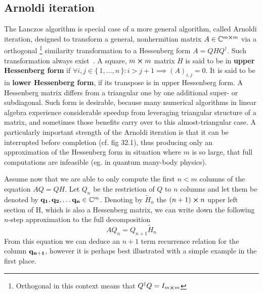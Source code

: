 \subsection{Arnoldi iteration}
The Lanczos algorithm is special case of a more general algorithm, called Arnoldi iteration, designed to transform
a general, nonhermitian matrix \(A\in \mathbb{C}^{m\cross m} \) via a orthogonal
\footnote{Orthogonal in this context means that \(Q^{\dagger}Q = I_{m \cross m}\)} similarity transformation to a Hessenberg form \(A = QHQ^{\dagger}\).
Such transformation always exist~\autocite{Garcia2017}. A square, \(m \cross m\) matrix \(H\) is said to be 
in \textbf{upper Hessenberg form} if \(\forall i,j\in \{\,1,\ldots,n\,\}: i > j+1 \implies (A)_{i,j}=0 \).
It is said to be in \textbf{lower Hessenberg form}, if its transpose is in upper Hessenberg form.
A Hessenberg matrix differs from a triangular one by one additional super- or subdiagonal.
Such form is desirable, because many numerical algorithms in linear algebra experience considerable speedup
from leveraging triangular structure of a matrix, and sometimes those benefits carry over to this almost-triangular
case. A particularly important strength of the Arnoldi iteration is that it can be interrupted before completion (cf. fig 32.1),
thus producing only an approximation of the Hessenberg form in situation where \(m\) is so large, that
full computations are infeasible (eg. in quantum many-body physics).

Assume now that we are able to only compute the first \(n < m\) columns of the equation \(AQ=QH\).
Let \(Q_n\) be the restriction of \(Q\) to \(n\) columns and let them be denoted by \(\vectorbold{q_1},\vectorbold{q_2}, \ldots 
\vectorbold{ q_n}\in \CC^m\).
Denoting by \(\tilde{H}_n\) the \((n+1)\cross n\) upper left section of H, which is also a Hessenberg matrix, we can 
write down the following \(n\)-step approximation to the full decomposition
\begin{equation}
	AQ_{n}=Q_{n+1}\tilde{H}_{n}
	\label{eq:krylov_n_approx}
\end{equation}
From this equation we can deduce an \(n+1\) term recurrence relation for the column \(\vectorbold{q_{n+1}}\), however
it is perhaps best illustrated with a simple example in the first place.


